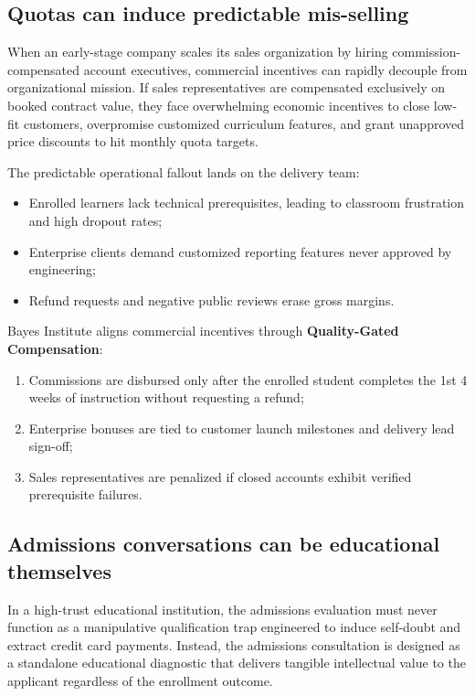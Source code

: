 \subsection{Quotas can induce predictable mis-selling}

When an early-stage company scales its sales organization by hiring commission-compensated account executives, commercial incentives can rapidly decouple from organizational mission. If sales representatives are compensated exclusively on booked contract value, they face overwhelming economic incentives to close low-fit customers, overpromise customized curriculum features, and grant unapproved price discounts to hit monthly quota targets.

The predictable operational fallout lands on the delivery team:
\begin{itemize}
\item Enrolled learners lack technical prerequisites, leading to classroom frustration and high dropout rates;
\item Enterprise clients demand customized reporting features never approved by engineering;
\item Refund requests and negative public reviews erase gross margins.
\end{itemize}
Bayes Institute aligns commercial incentives through \textbf{Quality-Gated Compensation}:
\begin{enumerate}
\item Commissions are disbursed only after the enrolled student completes the 1st 4 weeks of instruction without requesting a refund;
\item Enterprise bonuses are tied to customer launch milestones and delivery lead sign-off;
\item Sales representatives are penalized if closed accounts exhibit verified prerequisite failures.
\end{enumerate}

\subsection{Admissions conversations can be educational themselves}

In a high-trust educational institution, the admissions evaluation must never function as a manipulative qualification trap engineered to induce self-doubt and extract credit card payments. Instead, the admissions consultation is designed as a standalone educational diagnostic that delivers tangible intellectual value to the applicant regardless of the enrollment outcome.

